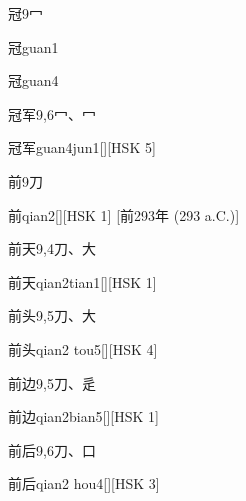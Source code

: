 \begin{entry}{冠}{9}{⼍}
  \begin{phonetics}{冠}{guan1}
  \end{phonetics}
  \begin{phonetics}{冠}{guan4}
  \end{phonetics}
\end{entry}

\begin{entry}{冠军}{9,6}{⼍、⼍}
  \begin{phonetics}{冠军}{guan4jun1}[][HSK 5]
  \end{phonetics}
\end{entry}

\begin{entry}{前}{9}{⼑}
  \begin{phonetics}{前}{qian2}[][HSK 1]
    [前293年  (293 a.C.)]
  \end{phonetics}
\end{entry}

\begin{entry}{前天}{9,4}{⼑、⼤}
  \begin{phonetics}{前天}{qian2tian1}[][HSK 1]
  \end{phonetics}
\end{entry}

\begin{entry}{前头}{9,5}{⼑、⼤}
  \begin{phonetics}{前头}{qian2 tou5}[][HSK 4]
  \end{phonetics}
\end{entry}

\begin{entry}{前边}{9,5}{⼑、⾡}
  \begin{phonetics}{前边}{qian2bian5}[][HSK 1]
  \end{phonetics}
\end{entry}

\begin{entry}{前后}{9,6}{⼑、⼝}
  \begin{phonetics}{前后}{qian2 hou4}[][HSK 3]
  \end{phonetics}
\end{entry}

